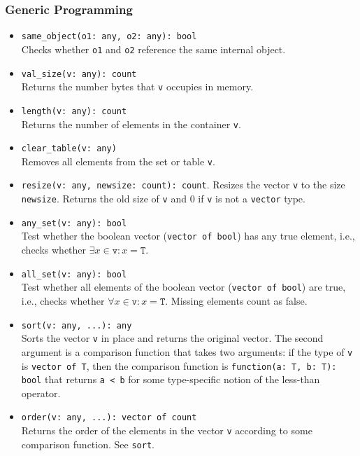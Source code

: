 \documentclass[10pt,landscape]{article}
\newcommand{\verbose}[1]{#1}
\newcommand{\verbose}[1]{}
\begin{document}
\begin{multicols*}{2}
\subsubsection*{Generic Programming}

\begin{itemize}
\verbose{
  \item \verb|same_object(o1: any, o2: any): bool|\\
    Checks whether \texttt{o1} and \texttt{o2} reference the same internal
    object.
  \item \verb|val_size(v: any): count|\\
    Returns the number bytes that \verb|v| occupies in memory.
}
  \item \verb|length(v: any): count|\\
    Returns the number of elements in the container \texttt{v}.
  \item \verb|clear_table(v: any)|\\
    Removes all elements from the set or table \texttt{v}.
  \item \verb|resize(v: any, newsize: count): count|.
    Resizes the vector \verb|v| to the size \verb|newsize|.
    Returns the old size of \verb|v| and 0 if \verb|v| is not a \verb|vector|
    type.
  \item \verb|any_set(v: any): bool|\\
    Test whether the boolean vector (\verb|vector of bool|) has any true
    element, i.e., checks whether $\exists x \in \mathtt{v}: x = \mathtt{T}$.
  \item \verb|all_set(v: any): bool|\\
    Test whether all elements of the boolean vector (\verb|vector of bool|) are
    true, i.e., checks whether $\forall x \in \mathtt{v}: x = \mathtt{T}$.
    Missing elements count as false.
  \item \verb|sort(v: any, ...): any|\\
    Sorts the vector \verb|v| in place and returns the original vector. 
    The second argument is a comparison function that takes two arguments: if
    the type of \verb|v| is \verb|vector of T|, then the comparison function is
    \verb|function(a: T, b: T): bool| that returns \verb|a < b| for some
    type-specific notion of the less-than operator.
  \item \verb|order(v: any, ...): vector of count|\\
    Returns the order of the elements in the vector \verb|v| according to some
    comparison function. See \verb|sort|.
\end{itemize}


\end{multicols*}
\end{document}
